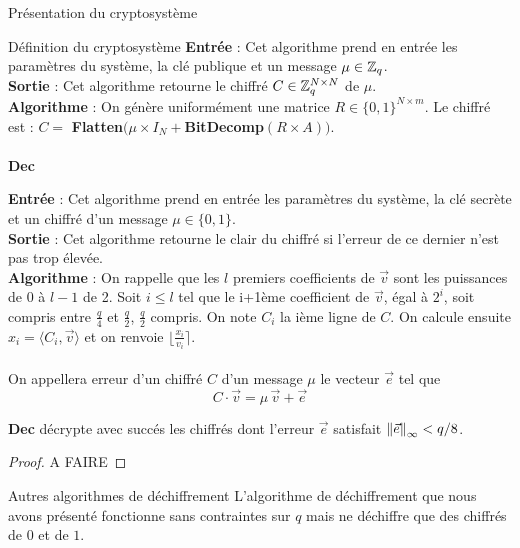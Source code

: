 \begin{section}{Présentation du cryptosystème}
\begin{subsection}{Définition du cryptosystème}
	\textbf{Entrée} : Cet algorithme prend en entrée les paramètres du système, la clé publique et un message $\mu \in \mathbb{Z}_q$. \\
	\textbf{Sortie} : Cet algorithme retourne le chiffré $C \in \mathbb{Z}_q^{N \times N}$ de $\mu$.\\
	\textbf{Algorithme} : On génère uniformément une matrice $R \in \{ 0,1\} ^{N \times m}$. Le chiffré est : $C = $ \textbf{Flatten}$(\mu \times I_N + $\textbf{BitDecomp}$(R \times A))$.
	
	\paragraph{}
	\textbf{Dec}
	\flushleft
	
	\textbf{Entrée} : Cet algorithme prend en entrée les paramètres du système, la clé secrète et un chiffré d'un message $\mu \in \{ 0,1\} $. \\
	\textbf{Sortie} : Cet algorithme retourne le clair du chiffré si l'erreur de ce dernier n'est pas trop élevée.\\
	\textbf{Algorithme} : On rappelle que les $l$ premiers coefficients de $\vec{v}$ sont les puissances de 0 à $l-1$ de 2. Soit $i \leqslant l$ tel que le i+1ème coefficient de $\vec{v}$, égal à $2^{i}$, soit compris entre $\frac{q}{4}$ et $\frac{q}{2}$, $\frac{q}{2}$ compris. On note $C_i$ la ième ligne de $C$. On calcule ensuite $x_i = \langle C_i, \vec{v} \rangle$ et on renvoie $\lfloor \frac{x_i}{v_i} \rceil$.


\paragraph{}
\begin{definition}
On appellera erreur d'un chiffré $C$ d'un message $\mu$ le vecteur $\vec{e}$ tel que  
\[ C\cdot \vec{v} = \mu\, \vec{v} + \vec{e} \]
\end{definition}
\begin{prop}
	\textbf{Dec} décrypte avec succés les chiffrés dont l'erreur $\vec{e}$
	satisfait ${\|\vec{e}\|}_{\infty} < q/8$.
\end{prop}
\begin{proof}
	A FAIRE
\end{proof}
	\end{subsection}
	
\begin{subsection}{Autres algorithmes de déchiffrement}
L'algorithme de déchiffrement que nous avons présenté fonctionne sans
contraintes sur $q$ mais ne déchiffre que des chiffrés de $0$ et de $1$.
	

\end{subsection}
\end{section}
